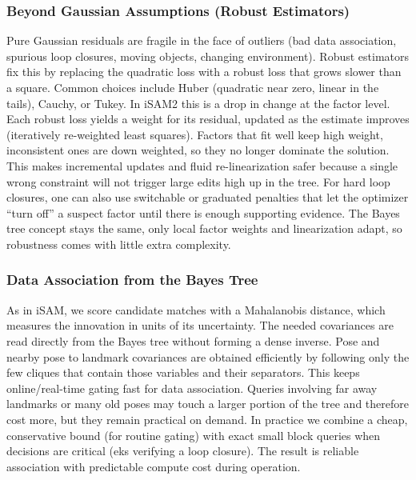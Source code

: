 \subsubsection{Beyond Gaussian Assumptions (Robust Estimators)}
Pure Gaussian residuals are fragile in the face of outliers (bad data association, spurious loop closures, moving objects, changing environment). Robust estimators fix this by replacing the quadratic loss with a robust loss that grows slower than a square. Common choices include Huber (quadratic near zero, linear in the tails), Cauchy, or Tukey. In iSAM2 this is a drop in change at the factor level. Each robust loss yields a weight for its residual, updated as the estimate improves (iteratively re-weighted least squares). Factors that fit well keep high weight, inconsistent ones are down weighted, so they no longer dominate the solution. This makes incremental updates and fluid re-linearization safer because a single wrong constraint will not trigger large edits high up in the tree. For hard loop closures, one can also use switchable or graduated penalties that let the optimizer ``turn off'' a suspect factor until there is enough supporting evidence. The Bayes tree concept stays the same, only local factor weights and linearization adapt, so robustness comes with little extra complexity.



\subsubsection{Data Association from the Bayes Tree}
As in iSAM, we score candidate matches with a Mahalanobis distance, which measures the innovation in units of its uncertainty. The needed covariances are read directly from the Bayes tree without forming a dense inverse. Pose and nearby pose to landmark covariances are obtained efficiently by following only the few cliques that contain those variables and their separators. This keeps online/real-time gating fast for data association. Queries involving far away landmarks or many old poses may touch a larger portion of the tree and therefore cost more, but they remain practical on demand. In practice we combine a cheap, conservative bound (for routine gating) with exact small block queries when decisions are critical (eks verifying a loop closure). The result is reliable association with predictable compute cost during operation.




